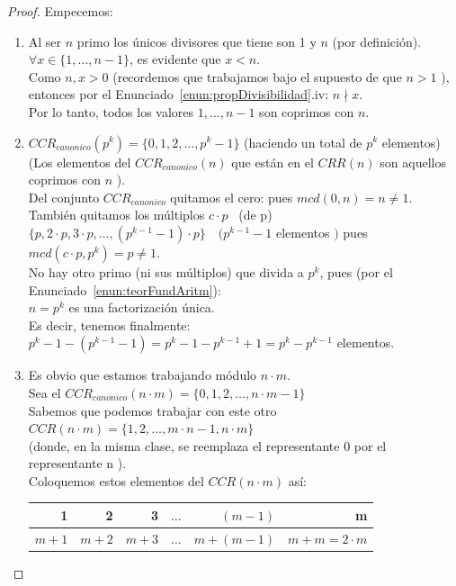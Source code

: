 \begin{proof} Empecemos:
\begin{enumerate}[label=\roman*)]
\item Al ser $n$ primo los únicos divisores que tiene son 1 y $n$ (por definición). \\
$\forall x \in \{1, \ldots, n-1\}$, es evidente que $x<n$.\\
Como $n, x>0$ (recordemos que trabajamos bajo el supuesto de que $n>1$ ), entonces por el Enunciado~\ref{enun:propDivisibilidad}.iv: $n \nmid x$. \\
Por lo tanto, todos los valores $1, \ldots, n-1$ son coprimos con $n$.
\item $CCR_{canonico}(p^{k})=\{0,1,2, \ldots, p^{k}-1\}$ (haciendo un total de $p^{k}$ elementos)\\
(Los elementos del $CCR_{canonico}(n)$ que están en el $CRR(n)$ son aquellos coprimos con $n$ ).\\
Del conjunto $CCR_{canonico}$ quitamos el cero: pues $mcd(0, n)=n \neq 1$.\\
También quitamos los múltiplos $c \cdot p$ \, (de p) \, \\
$\{p, 2 \cdot p, 3 \cdot p, \ldots,(p^{k-1}-1) \cdot p\} \quad (p^{k-1}-1$ elementos $)$ pues $mcd(c \cdot p, p^{k})=p \neq 1$.\\
No hay otro primo (ni sus múltiplos) que divida a $p^{k}$, pues (por el Enunciado~\ref{enun:teorFundAritm}):\\
$n=p^{k}$ es una factorización única.\\
Es decir, tenemos finalmente: $p^{k}-1-(p^{k-1}-1)=p^{k}-1-p^{k-1}+1=p^{k}-p^{k-1}$ elementos.
\item Es obvio que estamos trabajando módulo $n \cdot m$. \\
Sea el $CCR_{canonico}(n \cdot m)=\{0,1,2, \ldots, n \cdot m-1\}$\\
Sabemos que podemos trabajar con este otro\\
$CCR(n \cdot m)=\{1,2, \ldots, m \cdot n-1, n \cdot m\}$\\
(donde, en la misma clase, se reemplaza el representante 0 por el representante n ). \\
Coloquemos estos elementos del $CCR(n \cdot m)$ así: 
\begin{center}
\footnotesize
\begin{tabular}{|r|r|r|l|r|r|}
\hline
1 & 2 & 3 & $\ldots$ & $(m-1)$ & m \\
\hline
$m+1$ & $m+2$ & $m+3$ & $\ldots$ & $m+(m-1)$ & $m+m=2 \cdot m$ \\

\end{tabular}
\end{center}
\end{enumerate}
\end{proof}
